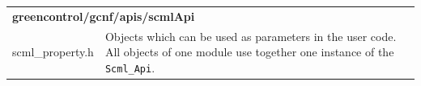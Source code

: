 

\noindent
\begin{minipage}{\textwidth}
\begin{tabularx}{\textwidth}{|l|X|}
	\cline{1-1}\cline{2-2}\multicolumn{2}{|l|}{  {\bf greencontrol/gcnf/apis/scmlApi}    }\\
	\cline{1-1}\cline{2-2} scml\_property.h    &  Objects which can be used as parameters in the user code. All objects of one module use together one instance of the \lstinline|Scml_Api|.    \\
	\hline
\end{tabularx}
\end{minipage}

